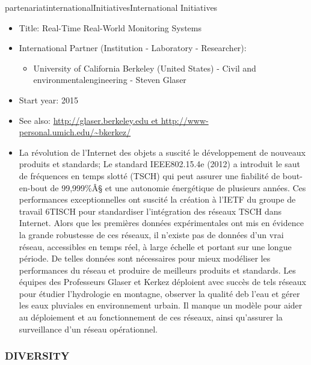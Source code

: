 \documentclass{ra2016}
\begin{document}
\begin{module}{partenariat}{internationalInitiatives}{International Initiatives}
\begin{itemize}
 \item Title: Real-Time Real-World Monitoring Systems
 \item International Partner (Institution -  Laboratory - Researcher):
 \begin{itemize}
    \item University of California Berkeley (United States)  
 - Civil and environmentalengineering - Steven Glaser
 \end{itemize}
 \item Start year: 2015 \item See also: \url{http://glaser.berkeley.edu et http://www-personal.umich.edu/~bkerkez/}
 \item La révolution de l'Internet des objets a suscité le développement de nouveaux produits et standards; Le standard IEEE802.15.4e (2012) a introduit le saut de fréquences en temps slotté (TSCH) qui peut assurer une fiabilité de bout-en-bout de 99,999\%Â§ et une autonomie énergétique de plusieurs années. Ces performances exceptionnelles ont suscité la création à l'IETF du groupe de travail 6TISCH pour standardiser l'intégration des réseaux TSCH dans Internet. Alors que les premières données expérimentales ont mis en évidence la grande robustesse de ces réseaux, il n'existe pas de données d'un vrai réseau, accessibles en temps réel, à large échelle et portant sur une longue période. De telles données sont nécessaires pour mieux modéliser les performances du réseau et produire de meilleurs produits et standards. Les équipes des Professeurs Glaser et Kerkez déploient avec succès de tels réseaux pour étudier l'hydrologie en montagne, observer la qualité deb l'eau et gérer les eaux pluviales en environnement urbain. Il manque un modèle pour aider au déploiement et au fonctionnement de ces réseaux, ainsi qu'assurer la surveillance d'un réseau opérationnel. 
\end{itemize}

\subsubsection{DIVERSITY}


\end{module}
\end{document}
